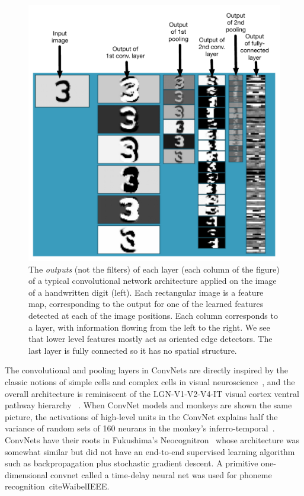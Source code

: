 \documentclass[10pts]{article}
\begin{document}
\begin{figure}[b]
\vspace{-4mm}
\begin{center}
  \includegraphics[width=0.70\linewidth]{convnet-diagram-labeled}
\end{center}
\vspace{-3mm}
\caption{The {\em outputs} (not the filters) of each layer (each column of the figure) 
of a typical convolutional network architecture
applied on the image of a handwritten digit (left). Each rectangular
image is a feature map, corresponding to the output for one of the learned features 
detected at each of the image positions.
Each column corresponds to a layer, with information flowing from the left to
the right. We see that lower level features mostly act as oriented edge detectors.
The last layer is fully connected so it has no spatial structure.
}
\vspace{-2mm}
\label{fig:convnet}
\end{figure}

The convolutional and pooling layers in ConvNets are directly inspired
by the classic notions of simple cells and complex cells in visual
neuroscience~\citep{Hubel62}, and the overall architecture is
reminiscent of the LGN-V1-V2-V4-IT visual cortex ventral pathway
hierarchy ~\citep{Felleman+VanEssen-1991}. When ConvNet models and
monkeys are shown the same picture, the activations of high-level
units in the ConvNet explains half the variance of random sets of 160
neurans in the monkey's
inferro-temporal~\citep{cadieu-plos-2014}. ConvNets have their roots
in Fukushima's Neocognitron~\citep{fukushima-82} whose architecture
was somewhat similar but did not have an end-to-end supervised
learning algorithm such as backpropagation plus stochastic gradient
descent. A primitive one-dimensional convnet called a time-delay
neural net was used for phoneme recognition~cite{WaibelIEEE}.
\end{document}
